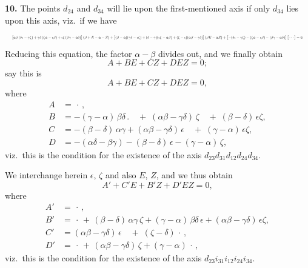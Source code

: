 \documentclass[11pt]{article}
\begin{document}
\medskip
\noindent\textbf{10.} The points $d_{24}$ and $d_{34}$ will lie upon the first-mentioned axis if only $d_{34}$ lies upon this axis, viz.\ if we have
\[
\resizebox{\textwidth}{!}{$\displaystyle
\bigl[\alpha\beta\,(\delta\epsilon - \gamma\zeta) + \gamma\delta\,(\zeta\alpha - \epsilon\beta) + \epsilon\zeta\,(\beta\gamma - \alpha\delta)\bigr]\,(\beta + E - \alpha - Z)
+ \bigl[(\beta - \alpha)(\gamma\delta - \epsilon\zeta) + (\delta - \gamma)(\epsilon\zeta - \alpha\beta) + (\zeta - \epsilon)(\alpha\beta - \gamma\delta)\bigr]\,(\beta E - \alpha Z)
+ \bigl[-(\delta\epsilon - \gamma\zeta) - (\zeta\alpha - \epsilon\beta) - (\beta\gamma - \alpha\delta)\bigr]\,\bigl[\,\cdots\,\bigr] = 0.
$}
\]
Reducing this equation, the factor $\alpha - \beta$ divides out, and we finally obtain
\[
A + BE + CZ + DEZ = 0;
\]
say this is
\[
A + BE + CZ + DEZ = 0,
\]
where
\[
\begin{aligned}
A &= \,\cdot\, , \\
B &= -(\gamma - \alpha)\,\beta\delta\,. \quad +\; (\alpha\beta - \gamma\delta)\,\zeta \quad +\; (\beta - \delta)\,\epsilon\zeta, \\
C &= -(\beta - \delta)\,\alpha\gamma + (\alpha\beta - \gamma\delta)\,\epsilon \quad +\; (\gamma - \alpha)\,\epsilon\zeta, \\
D &= -(\alpha\delta - \beta\gamma) - (\beta - \delta)\,\epsilon - (\gamma - \alpha)\,\zeta,
\end{aligned}
\]
viz.\ this is the condition for the existence of the axis $d_{23}d_{31}d_{12}d_{24}d_{34}$.

We interchange herein $\epsilon$, $\zeta$ and also $E$, $Z$, and we thus obtain
\[
A' + C'E + B'Z + D'EZ = 0,
\]
where
\[
\begin{aligned}
A' &= \,\cdot\, , \\
B' &= \,\cdot\, +\, (\beta - \delta)\,\alpha\gamma\,\zeta + (\gamma - \alpha)\,\beta\delta\,\epsilon + (\alpha\beta - \gamma\delta)\,\epsilon\zeta, \\
C' &= (\alpha\beta - \gamma\delta)\,\epsilon \quad +\; (\zeta - \delta)\,\cdot\, , \\
D' &= \,\cdot\, +\, (\alpha\beta - \gamma\delta)\,\zeta + (\gamma - \alpha)\,\cdot\, ,
\end{aligned}
\]
viz.\ this is the condition for the existence of the axis $d_{23}i_{31}i_{12}i_{24}i_{34}$.
\end{document}
